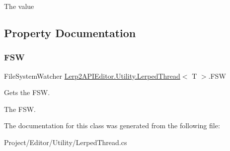 The value 



\subsection{Property Documentation}
\mbox{\label{class_lerp2_a_p_i_editor_1_1_utility_1_1_lerped_thread_a65c8afd672d7f9fcc79b6c212d1fc590}} 
\subsubsection{\texorpdfstring{F\+SW}{FSW}}
{\footnotesize\ttfamily File\+System\+Watcher \hyperlink{class_lerp2_a_p_i_editor_1_1_utility_1_1_lerped_thread}{Lerp2\+A\+P\+I\+Editor.\+Utility.\+Lerped\+Thread}$<$ T $>$.F\+SW\hspace{0.3cm}{\ttfamily [get]}}



Gets the F\+SW. 

The F\+SW.

The documentation for this class was generated from the following file\+:\begin{DoxyCompactItemize}
\item 
Project/\+Editor/\+Utility/Lerped\+Thread.\+cs\end{DoxyCompactItemize}
